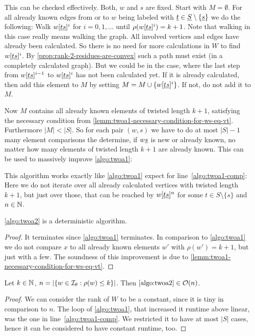 This can be checked effectively. Both, $w$ and $s$ are fixed. Start with $M = \emptyset$. For all already known edges from or to $w$ being labeled with $\underline{t} \in \underline{S} \setminus \{\underline{s}\}$ we do the following: Walk $w[\underline{t} \underline{s}]^i$ for $i = 0,1,\ldots$ until $\rho(w[\underline{t} \underline{s}]^i) = k + 1$. Note that walking in this case really means walking the graph. All involved vertices and edges have already been calculated. So there is no need for more calculations in $W$ to find $w[\underline{t} \underline{s}]^i$. By \ref{prop:rank-2-residues-are-convex} such a path must exist (in a completely calculated graph). But we could be in the case, where the last step from $w[\underline{t} \underline{s}]^{i-1}$ to $w[\underline{t} \underline{s}]^{i}$ has not been calculated yet. If it is already calculated, then add this element to $M$ by setting $M = M \cup \{ w[\underline{t} \underline{s}]^{i} \}$. If not, do not add it to $M$.

Now $M$ contains all already known elements of twisted length $k+1$, satisfying the necessary condition from \ref{lemm:twoa1-necessary-condition-for-ws-eq-vt}. Furthermore $|M| < |S|$. So for each pair $(w,s)$ we have to do at most $|S|-1$ many element comparisons the determine, if $w \underline{s}$ is new or already known, no matter how many elements of twisted length $k+1$ are already known. This can be used to massively improve \ref{algo:twoa1}:

\begin{algo}[TWOA2]
	This algorithm works exactly like \ref{algo:twoa1} expect for line~\ref{algo:twoa1-comp}: Here we do not iterate over all already calculated vertices with twisted length $k+1$, but just over those, that can be reached by $w[\underline{t} \underline{s}]^n$ for some $t \in S \setminus \{s\}$ and $n \in \mathbb{N}$.
\end{algo}

\begin{lemm}
	\ref{algo:twoa2} is a deterministic algorithm.

	\begin{proof}
		It terminates since \ref{algo:twoa1} terminates. In comparison to \ref{algo:twoa1} we do not compare $x$ to all already known elements $w'$ with $\rho(w') = k+1$, but just with a few. The soundness of this improvement is due to \ref{lemm:twoa1-necessary-condition-for-ws-eq-vt}.
	\end{proof}
\end{lemm}

\begin{lemm}
	Let $k \in \mathbb{N}$, $n = |\{ w \in \mathcal{I}_{\theta} : \rho(w) \leq k \}|$. Then $\ref{algo:twoa2} \in \mathcal{O}(n)$.

	\begin{proof}
		We can consider the rank of $W$ to be a constant, since it is tiny in comparison to $n$. The loop of \ref{algo:twoa1}, that increased it runtime above linear, was the one in line~\ref{algo:twoa1-comp}. We restricted it to have at most $|S|$ cases, hence it can be considered to have constant runtime, too.
	\end{proof}
\end{lemm}

